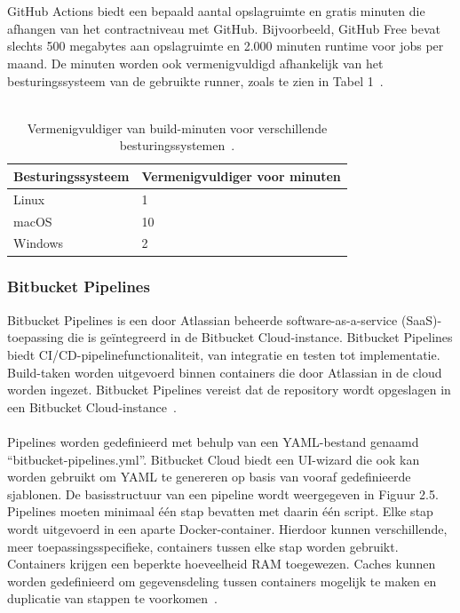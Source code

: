 \\\\
GitHub Actions biedt een bepaald aantal opslagruimte en gratis minuten die afhangen van het contractniveau met GitHub. Bijvoorbeeld, GitHub Free bevat slechts 500 megabytes aan opslagruimte en 2.000 minuten runtime voor jobs per maand. De minuten worden ook vermenigvuldigd afhankelijk van het besturingssysteem van de gebruikte runner, zoals te zien in Tabel 1~\autocite{githubActionsBilling}.
\\\\
\begin{table}[h!]
    \centering
    \begin{tabular}{|l|l|}
        \hline
        \textbf{Besturingssysteem} & \textbf{Vermenigvuldiger voor minuten} \\ \hline
        Linux                       & 1                                     \\ \hline
        macOS                       & 10                                    \\ \hline
        Windows                     & 2                                     \\ \hline
    \end{tabular}
    \caption{Vermenigvuldiger van build-minuten voor verschillende besturingssystemen~\autocite{githubActionsBilling}.}
    \label{tab:minutes_multiplier}
\end{table}

\newpage

\subsubsection{Bitbucket Pipelines}

Bitbucket Pipelines is een door Atlassian beheerde software-as-a-service (SaaS)-toepassing die is geïntegreerd in de Bitbucket Cloud-instance. Bitbucket Pipelines biedt CI/CD-pipelinefunctionaliteit, van integratie en testen tot implementatie. Build-taken worden uitgevoerd binnen containers die door Atlassian in de cloud worden ingezet. Bitbucket Pipelines vereist dat de repository wordt opgeslagen in een Bitbucket Cloud-instance~\autocite{atlassianStarted}.
\\\\
Pipelines worden gedefinieerd met behulp van een YAML-bestand genaamd “bitbucket-pipelines.yml”. Bitbucket Cloud biedt een UI-wizard die ook kan worden gebruikt om YAML te genereren op basis van vooraf gedefinieerde sjablonen. De basisstructuur van een pipeline wordt weergegeven in Figuur 2.5. Pipelines moeten minimaal één stap bevatten met daarin één script. Elke stap wordt uitgevoerd in een aparte Docker-container. Hierdoor kunnen verschillende, meer toepassingsspecifieke, containers tussen elke stap worden gebruikt. Containers krijgen een beperkte hoeveelheid RAM toegewezen. Caches kunnen worden gedefinieerd om gegevensdeling tussen containers mogelijk te maken en duplicatie van stappen te voorkomen~\autocite{atlassianConfigure}.
\\\\

